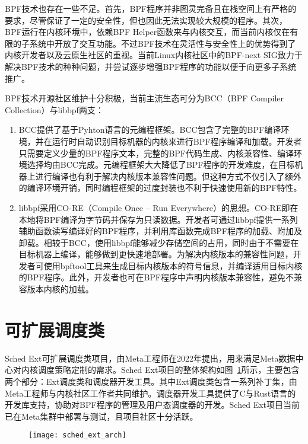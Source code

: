 BPF技术也存在一些不足。首先，BPF程序并非图灵完备且在栈空间上有严格的要求，尽管保证了一定的安全性，但也因此无法实现较大规模的程序。其次，BPF运行在内核环境中，依赖BPF Helper函数来与内核交互，而当前内核仅在有限的子系统中开放了交互功能。不过BPF技术在灵活性与安全性上的优势得到了内核开发者以及云原生社区的重视。当前Linux内核社区中的BPF-next SIG致力于解决BPF技术的种种问题，并尝试逐步增强BPF程序的功能以便于向更多子系统推广。

BPF技术开源社区维护十分积极，当前主流生态可分为BCC（BPF Compiler Collection）\citep{bcc}与libbpf\citep{libbpf}两支：

\begin{enumerate}

    \item BCC提供了基于Pyhton语言的元编程框架。BCC包含了完整的BPF编译环境，并在运行时自动识别目标机器的内核来进行BPF程序编译和加载。开发者只需要定义少量的BPF程序文本，完整的BPF代码生成、内核兼容性、编译环境选择均由BCC完成。元编程框架大大降低了BPF程序的开发难度，在目标机器上进行编译也有利于解决内核版本兼容性问题。但这种方式不仅引入了额外的编译环境开销，同时编程框架的过度封装也不利于快速使用新的BPF特性。

    \item libbpf采用CO-RE（Compile Once – Run Everywhere）的思想。CO-RE即在本地将BPF编译为字节码并保存为只读数据。开发者可通过libbpf提供一系列辅助函数读写编译好的BPF程序，并利用库函数完成BPF程序的加载、附加及卸载。相较于BCC，使用libbpf能够减少存储空间的占用，同时由于不需要在目标机器上编译，能够做到更快速地部署。为解决内核版本的兼容性问题，开发者可使用bpftool工具来生成目标内核版本的符号信息，并编译适用目标内核的BPF程序。此外，开发者也可在BPF程序中声明内核版本兼容性，避免不兼容版本内核的加载。

\end{enumerate}

\section{可扩展调度类}

Sched Ext可扩展调度类项目\citep{schedext}，由Meta工程师在2022年提出，用来满足Meta数据中心对内核调度策略定制的需求。Sched Ext项目的整体架构如图~\ref{fig:sched_ext_arch}所示，主要包含两个部分：Ext调度类和调度器开发工具。其中Ext调度类包含一系列补丁集，由Meta工程师与内核社区工作者共同维护。调度器开发工具提供了C与Rust语言的开发库支持，协助对BPF程序的管理及用户态调度器的开发。Sched Ext项目当前已在Meta集群中部署与测试，且项目社区十分活跃。

\begin{figure}[!htbp]
    \centering
    \texttt{[image: sched\_ext\_arch]}
    \label{fig:sched_ext_arch}
\end{figure}

